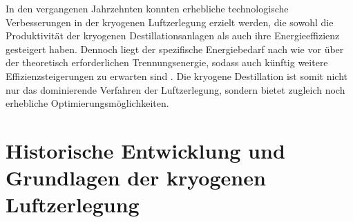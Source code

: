 In den vergangenen Jahrzehnten konnten erhebliche technologische Verbesserungen in der kryogenen Luftzerlegung erzielt werden, die sowohl die Produktivität der kryogenen Destillationsanlagen als auch ihre Energieeffizienz gesteigert haben. Dennoch liegt der spezifische Energiebedarf nach wie vor über der theoretisch erforderlichen Trennungsenergie, sodass auch künftig weitere Effizienzsteigerungen zu erwarten sind \cite{dardeAirSeparationFlue2009}. Die kryogene Destillation ist somit nicht nur das dominierende Verfahren der Luftzerlegung, sondern bietet zugleich noch erhebliche Optimierungsmöglichkeiten. \\

\section{Historische Entwicklung und Grundlagen der kryogenen Luftzerlegung}
\label{sec:grundlagen_historie_kryogene}

